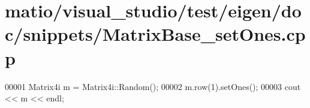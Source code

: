 \hypertarget{matio_2visual__studio_2test_2eigen_2doc_2snippets_2_matrix_base__set_ones_8cpp_source}{}\section{matio/visual\+\_\+studio/test/eigen/doc/snippets/\+Matrix\+Base\+\_\+set\+Ones.cpp}
\label{matio_2visual__studio_2test_2eigen_2doc_2snippets_2_matrix_base__set_ones_8cpp_source}

\begin{DoxyCode}
00001 Matrix4i m = Matrix4i::Random();
00002 m.row(1).setOnes();
00003 cout << m << endl;
\end{DoxyCode}
